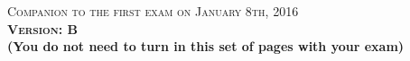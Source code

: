 \documentclass{docist}
\begin{document}
\thispagestyle{empty}

\begin{center}
  {\Large \textsc{Companion to the first exam on January 8th, 2016\\[2ex]
  \textbf{Version: B}\\[2ex]}}
  {\normalsize  \textbf{(You do not need to turn in this set of pages with your exam)}}
\end{center}




\qContinousIntegrationScenariosTacticsOne


\qInfinispanScenariosTacticsOne


\qWebTwoOne


\qMicroservicesArchitectureOne


\qAmazonOne


\qDesigningArchitectureOne


\qModuleViewtypeOneOne


\qUsesGeneralizationOne


\qLayeredAspectsDataModelOne


\qAvailabilityOne


\qModifiabilityOneOne


\qPerformanceOneOne


\qNginxScenariosTacticsOne


\qComponentConnectorOne


\qRepositoryClientServerOne

\end{document}
